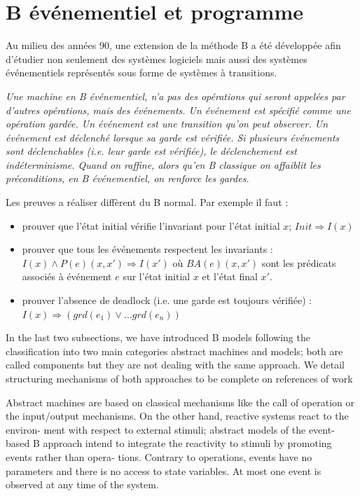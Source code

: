 \documentclass[10pt,a4paper]{article}
\begin{document}
{\section{B événementiel et programme}

Au milieu des années 90, une extension de la méthode B a été développée afin d'étudier non seulement des systèmes logiciels mais aussi des systèmes événementiels représentés sous forme de systèmes à transitions.

\emph{Une machine en B  événementiel, n'a pas des opérations qui seront appelées par d'autres opérations, mais des  événements. Un  événement est spécifié comme une opération gardée. Un événement  est une transition qu'on peut observer.\newline
\indent Un  événement est déclenché lorsque sa garde est vérifiée. Si plusieurs événements sont déclenchables (i.e. leur garde est vérifiée), le déclenchement est indéterminisme. \newline
\indent Quand on raffine, alors qu'en B classique on affaiblit les préconditions, en B événementiel, on renforce les gardes.}\cite{habrias2006specifications}

Les preuves a réaliser diffèrent du B \og normal\fg. Par exemple il faut :
\begin{itemize}
\item prouver que l'état initial vérifie l'invariant pour l'état initial $x$; $ Init \Rightarrow I(x)$
\item prouver que tous les événements respectent les invariants : $ I(x) \wedge P(e)(x, x') \Rightarrow I(x')$ où $BA(e)(x, x')$ sont les prédicats associés à événement $e$ sur l'état initial $x$ et l'état final $x'$.
\item prouver l'absence de deadlock (i.e. une garde est toujours vérifiée) : $ I(x) \Rightarrow \left( grd(e_1) \vee \ldots grd(e_n) \right)$
\end{itemize}

\iffalse
In the last two subsections, we have introduced B models following the classification
into two main categories abstract machines and models; both are called components
but they are not dealing with the same approach. We detail structuring mechanisms
of both approaches to be complete on references of work 

Abstract machines are based on classical mechanisms like the call of operation or the
input/output mechanisms. On the other hand, reactive systems react to the environ-
ment with respect to external stimuli; abstract models of the event-based B approach
intend to integrate the reactivity to stimuli by promoting events rather than opera-
tions.
Contrary to operations, events have no parameters and there is no access to
state variables. At most one event is observed at any time of the system.

}
\end{document}
